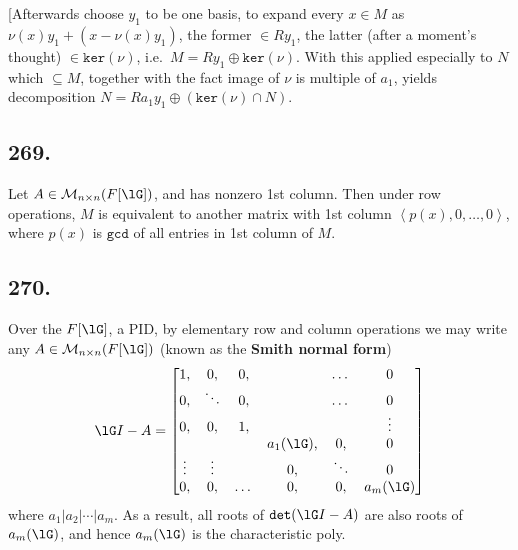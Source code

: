 \documentclass[12pt]{article}
\newcommand{\X}\times%
\newcommand{\Ab}[1]{ \left\langle #1 \right\rangle } %
\newcommand{\CF}[1]{ \mathcal{#1} }%
\newcommand{\Ss}[1]{\textsf{\bfseries{#1}}}%
\newcommand{\Tw}[1]{\texttt{#1}}%
\begin{document}
[Afterwards choose \(y_1\) to be one basis, to expand every \(x \in M\) as \(\nu(x) y_1 +(x -\nu(x) y_1)\), the former \(\in Ry_1\), the latter (after a moment's thought) \(\in \Tw{ker}(\nu)\), i.e.\  \(M =R y_1 \oplus \Tw{ker}(\nu)\). 
With this applied especially to \(N\) which \(\subseteq M\), together with the fact image of \(\nu\) is multiple of \(a_1\), yields decomposition \(N =R a_1 y_1 \oplus (\Tw{ker}(\nu) \cap N)\). \par
[Then math.\ induction may be used. 
From above decomposition of \(M\) and the induction premise, since \(\Tw{ker}(\nu)\) has rank \(n-1\) (maximum no.\ of linear indep.\ elements), submodule \(\Tw{ker}(\nu) \cap N\) has smaller, finite rank, say \(m-1\), again from above decomposition of \(N\); thus \(N\) has rank \(m\). \par
[Apply the induction premise to find suitable basis \(y_2, \dotsc, y_n\) of \(M\), such that \(a_2 y_2, \dotsc, a_m y_m\), of \(N\), with \(a_2 \Big| a_m\).
It remains to show \(a_1 \Big| a_2\). 
Consider \(\fG(y_1) =\fG(y_2) :=1\), and \(\fG(y_i) =0\) otherwise. 
Then \(\Ab{a_1} =\Ab{\fG(a_1 y_1)} \subseteq \fG(N)\), because \(a_1 y_1\) is a free generator; but \(\Ab{a_1}\) is maximal, so \(\Ab{a_1} =\fG(N)\). 
Similarly, \(\Ab{a_2} \subseteq \fG(N)\). 
As a result, \(a_2 \in \Ab{a_1}\).]

\subsection*{269.} Let \(A \in \CF{M}_{n \X n}(F[\lG])\), and has nonzero 1st column. 
Then under row operations, \(M\) is equivalent to another matrix with 1st column \(\Ab{p(x),0,\dotsc,0}\), where \(p(x)\) is \(\Tw{gcd}\) of all entries in 1st column of \(M\). 

\subsection*{270.} Over the \(F[\lG]\), a PID, by elementary row and column operations we may write any \(A \in \CF{M}_{n \X n}(F[\lG])\) (known as the \Ss{Smith normal form}) \begin{gather*} 
 \lG I -A = \begin{bmatrix}
 1, &0, &0, & &\dotsc &0 \\
 0, &\ddots &0, & &\dotsc &0 \\
 0, &0, &1, & & &\vdots \\
  & & &a_1(\lG), &0, &0 \\
 \vdots &\vdots & &0, &\ddots &0 \\
 0, &0, &\dotsc &0, &0, &a_m(\lG)
\end{bmatrix}\end{gather*} where \(a_1 \Big| a_2 \Big| \dotsb \Big| a_m\). 
As a result, all roots of \(\Tw{det}(\lG I -A)\) are also roots of \(a_m(\lG)\), and hence \(a_m(\lG)\) is the characteristic poly. 
\end{document}
